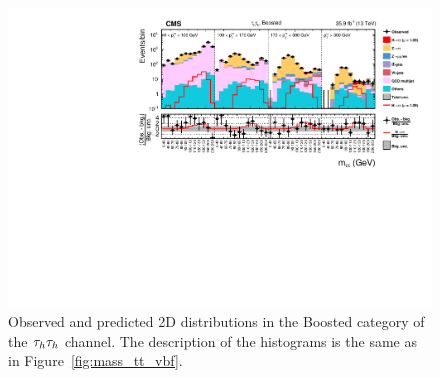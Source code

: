 %
%

\begin{figure}[htbp]
\centering
     \includegraphics[width=1.0\textwidth]{higgs_to_taus/plots/Figure_010.pdf}
     \caption{Observed and predicted 2D distributions in the Boosted category of the $\tau_{h}\tau_{h}$ channel. The description of the histograms is the same as in Figure~\ref{fig:mass_tt_vbf}.}
     \label{fig:mass_tt_boosted}
\end{figure}

